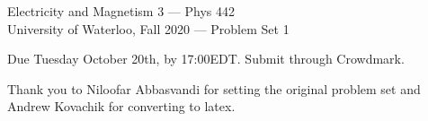 \documentclass[12pt,geometry,width=8in]{article}
\begin{document}
\chead{}
\renewcommand{\headrulewidth}{0pt}

\begin{center}
  {\large
    Electricity and Magnetism 3 --- Phys 442  \\
    University of Waterloo, Fall 2020
    --- Problem Set 1
    \par
  }
\end{center}

\vspace{0.1in}

Due Tuesday October 20th, by 17:00EDT.  Submit through Crowdmark.

\vspace{0.1in}

\noindent
Thank you to Niloofar Abbasvandi for setting the original problem set and Andrew Kovachik for converting to latex.
\end{document}
